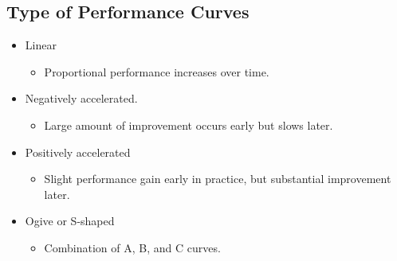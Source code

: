 \documentclass[
  letterpaper,
  DIV=11,
  numbers=noendperiod]{scrartcl}
\providecommand{\tightlist}{%
  \setlength{\itemsep}{0pt}\setlength{\parskip}{0pt}}\usepackage{longtable,booktabs,array}
\begin{document}
\hypertarget{type-of-performance-curves}{%
\subsection{Type of Performance
Curves}\label{type-of-performance-curves}}

\begin{itemize}
\tightlist
\item
  Linear

  \begin{itemize}
  \tightlist
  \item
    Proportional performance increases over time.\hspace{0pt}
  \end{itemize}
\item
  Negatively accelerated.\hspace{0pt}

  \begin{itemize}
  \tightlist
  \item
    Large amount of improvement occurs early but slows
    later.\hspace{0pt}
  \end{itemize}
\item
  Positively accelerated

  \begin{itemize}
  \tightlist
  \item
    Slight performance gain early in practice, but substantial
    improvement later.\hspace{0pt}
  \end{itemize}
\item
  Ogive or S-shaped\hspace{0pt}

  \begin{itemize}
  \tightlist
  \item
    Combination of A, B, and C curves.\hspace{0pt}
  \end{itemize}
\end{itemize}
\end{document}
